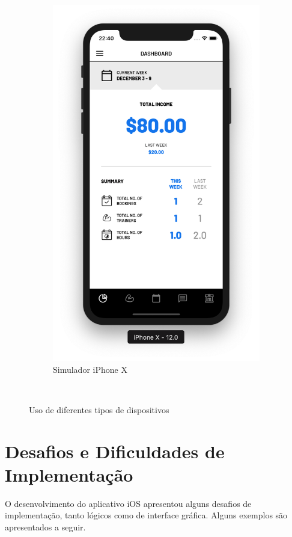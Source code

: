 \begin{figure}[H]
\begin{subfigure}[b]{0.3\textwidth}
        \includegraphics[width=\textwidth]{pfc/figuras/x.png}
        \caption{Simulador iPhone X}
        \label{fig:x}
    \end{subfigure}
    ~
    \caption{Uso de diferentes tipos de dispositivos}
    \label{fig:devices}
\end{figure}

\section{Desafios e Dificuldades de Implementação}
O desenvolvimento do aplicativo iOS apresentou alguns desafios de implementação, tanto lógicos como de interface gráfica. Alguns exemplos são apresentados a seguir.

